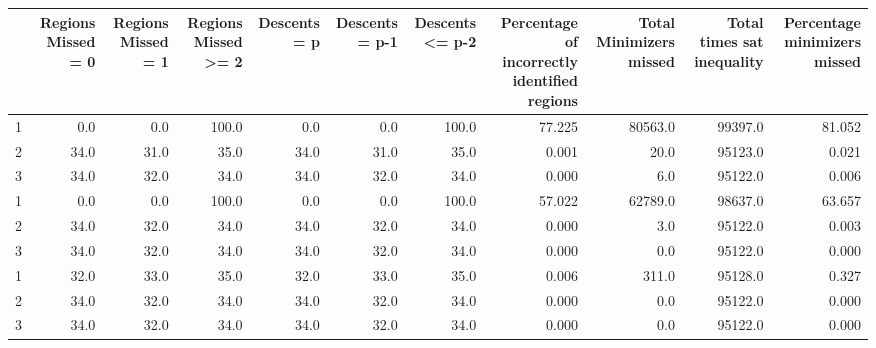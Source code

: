 \begin{tabular}{lrrrrrrrrrr}
\toprule
{} &  Regions Missed = 0 &  Regions Missed = 1 &  Regions Missed >= 2 &  Descents = p &  Descents = p-1 &  Descents <= p-2 &  Percentage of incorrectly identified regions &  Total Minimizers missed &  Total times sat inequality &  Percentage minimizers missed \\
\midrule
1 &                 0.0 &                 0.0 &                100.0 &           0.0 &             0.0 &            100.0 &                                        77.225 &                  80563.0 &                     99397.0 &                        81.052 \\
2 &                34.0 &                31.0 &                 35.0 &          34.0 &            31.0 &             35.0 &                                         0.001 &                     20.0 &                     95123.0 &                         0.021 \\
3 &                34.0 &                32.0 &                 34.0 &          34.0 &            32.0 &             34.0 &                                         0.000 &                      6.0 &                     95122.0 &                         0.006 \\
1 &                 0.0 &                 0.0 &                100.0 &           0.0 &             0.0 &            100.0 &                                        57.022 &                  62789.0 &                     98637.0 &                        63.657 \\
2 &                34.0 &                32.0 &                 34.0 &          34.0 &            32.0 &             34.0 &                                         0.000 &                      3.0 &                     95122.0 &                         0.003 \\
3 &                34.0 &                32.0 &                 34.0 &          34.0 &            32.0 &             34.0 &                                         0.000 &                      0.0 &                     95122.0 &                         0.000 \\
1 &                32.0 &                33.0 &                 35.0 &          32.0 &            33.0 &             35.0 &                                         0.006 &                    311.0 &                     95128.0 &                         0.327 \\
2 &                34.0 &                32.0 &                 34.0 &          34.0 &            32.0 &             34.0 &                                         0.000 &                      0.0 &                     95122.0 &                         0.000 \\
3 &                34.0 &                32.0 &                 34.0 &          34.0 &            32.0 &             34.0 &                                         0.000 &                      0.0 &                     95122.0 &                         0.000 \\
\bottomrule
\end{tabular}
